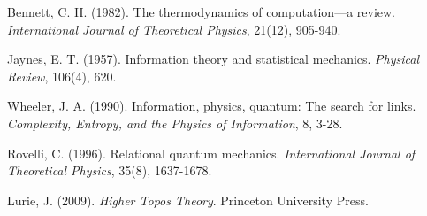 \documentclass[12pt]{article}
\begin{document}
\begin{thebibliography}{99}
 Bennett, C. H. (1982). The thermodynamics of computation—a review. \textit{International Journal of Theoretical Physics}, 21(12), 905-940.

 Jaynes, E. T. (1957). Information theory and statistical mechanics. \textit{Physical Review}, 106(4), 620.

 Wheeler, J. A. (1990). Information, physics, quantum: The search for links. \textit{Complexity, Entropy, and the Physics of Information}, 8, 3-28.

 Rovelli, C. (1996). Relational quantum mechanics. \textit{International Journal of Theoretical Physics}, 35(8), 1637-1678.

 Lurie, J. (2009). \textit{Higher Topos Theory}. Princeton University Press.

\end{thebibliography}
\end{document}
